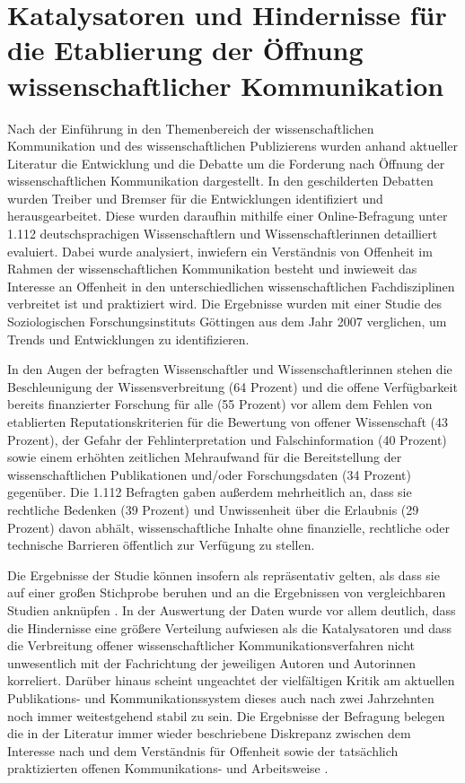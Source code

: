 \section{Katalysatoren und Hindernisse für die Etablierung der Öffnung wissenschaftlicher Kommunikation}

Nach der Einführung in den Themenbereich der wissenschaftlichen Kommunikation und des wissenschaftlichen Publizierens wurden anhand aktueller Literatur die Entwicklung und die Debatte um die Forderung nach Öffnung der wissenschaftlichen Kommunikation dargestellt. In den geschilderten Debatten wurden Treiber und Bremser für die Entwicklungen identifiziert und herausgearbeitet. Diese wurden daraufhin mithilfe einer Online-Befragung unter 1.112 deutschsprachigen Wissenschaftlern und Wissenschaftlerinnen detailliert evaluiert. Dabei wurde analysiert, inwiefern ein Verständnis von Offenheit im Rahmen der wissenschaftlichen Kommunikation besteht und inwieweit das Interesse an Offenheit in den unterschiedlichen wissenschaftlichen Fachdisziplinen verbreitet ist und praktiziert wird. Die Ergebnisse wurden mit einer Studie des Soziologischen Forschungsinstituts Göttingen aus dem Jahr 2007 verglichen, um Trends und Entwicklungen zu identifizieren.

In den Augen der befragten Wissenschaftler und Wissenschaftlerinnen stehen die Beschleunigung der Wissensverbreitung (64 Prozent) und die offene Verfügbarkeit bereits finanzierter Forschung für alle (55 Prozent) vor allem dem Fehlen von etablierten Reputationskriterien für die Bewertung von offener Wissenschaft (43 Prozent), der Gefahr der Fehlinterpretation und Falschinformation (40 Prozent) sowie einem erhöhten zeitlichen Mehraufwand für die Bereitstellung der wissenschaftlichen Publikationen und/oder Forschungsdaten (34 Prozent) gegenüber. Die 1.112 Befragten gaben außerdem mehrheitlich an, dass sie rechtliche Bedenken (39 Prozent) und Unwissenheit über die Erlaubnis (29 Prozent) davon abhält, wissenschaftliche Inhalte ohne finanzielle, rechtliche oder technische Barrieren öffentlich zur Verfügung zu stellen.

Die Ergebnisse der Studie können insofern als repräsentativ gelten, als dass sie auf einer großen Stichprobe beruhen und an die Ergebnissen von vergleichbaren Studien anknüpfen \cite{Hanekop_2007}. In der Auswertung der Daten wurde vor allem deutlich, dass die Hindernisse eine größere Verteilung aufwiesen als die Katalysatoren und dass die Verbreitung offener wissenschaftlicher Kommunikationsverfahren nicht unwesentlich mit der Fachrichtung der jeweiligen Autoren und Autorinnen korreliert. Darüber hinaus scheint ungeachtet der vielfältigen Kritik am aktuellen Publikations- und Kommunikationssystem dieses auch nach zwei Jahrzehnten noch immer weitestgehend stabil zu sein. Die Ergebnisse der Befragung belegen die in der Literatur immer wieder beschriebene Diskrepanz zwischen dem Interesse nach und dem Verständnis für Offenheit sowie der tatsächlich praktizierten offenen Kommunikations- und Arbeitsweise \cite{Yiotis_2013} \cite{Bartling_2013} \cite{hagner_2015_sache_buches} \cite{Fecher_2015}.

